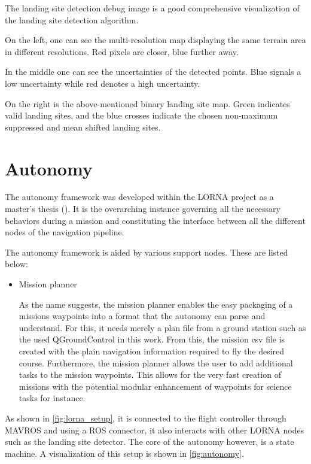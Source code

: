 The landing site detection debug image is a good comprehensive visualization of the landing site detection algorithm. 

On the left, one can see the multi-resolution map displaying the same terrain area in different resolutions. Red pixels are closer, blue further away.

In the middle one can see the uncertainties of the detected points. Blue signals a low uncertainty while red denotes a high uncertainty. 

On the right is the above-mentioned binary landing site map. Green indicates valid landing sites, and the blue crosses indicate the chosen non-maximum suppressed and mean shifted landing sites.   

\section{Autonomy}\label{sec:setup:autonomy}

The autonomy framework was developed within the LORNA project as a master's thesis (\citep{Autonomy}). It is the overarching instance governing all the necessary behaviors during a mission and constituting the interface between all the different nodes of the navigation pipeline.

The autonomy framework is aided by various support nodes. These are listed below:

\begin{itemize}
    \item Mission planner

    As the name suggests, the mission planner enables the easy packaging of a missions waypoints into a format that the autonomy can parse and understand. For this, it needs merely a plan file from a ground station such as the used QGroundControl in this work. From this, the mission csv file is created with the plain navigation information required to fly the desired course. Furthermore, the mission planner allows the user to add additional tasks to the mission waypoints. This allows for the very fast creation of missions with the potential modular enhancement of waypoints for science tasks for instance. 
\end{itemize}
As shown in \cref{fig:lorna_setup}, it is connected to the flight controller through MAVROS and using a ROS connector, it also interacts with other LORNA nodes such as the landing site detector. The core of the autonomy however, is a state machine. A visualization of this setup is shown in \cref{fig:autonomy}.

